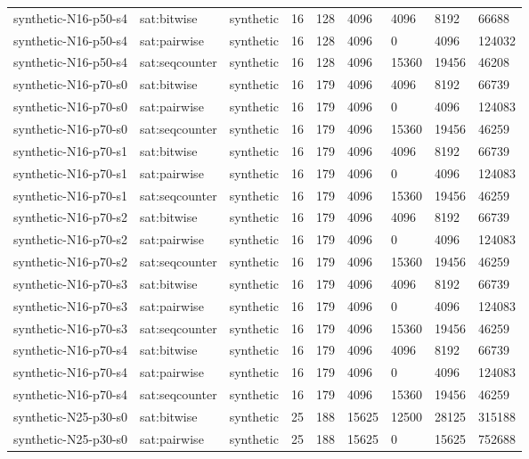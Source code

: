 \begin{tabular}{lllllllll}
synthetic-N16-p50-s4 & sat:bitwise & synthetic & 16 & 128 & 4096 & 4096 & 8192 & 66688 \\
synthetic-N16-p50-s4 & sat:pairwise & synthetic & 16 & 128 & 4096 & 0 & 4096 & 124032 \\
synthetic-N16-p50-s4 & sat:seqcounter & synthetic & 16 & 128 & 4096 & 15360 & 19456 & 46208 \\
synthetic-N16-p70-s0 & sat:bitwise & synthetic & 16 & 179 & 4096 & 4096 & 8192 & 66739 \\
synthetic-N16-p70-s0 & sat:pairwise & synthetic & 16 & 179 & 4096 & 0 & 4096 & 124083 \\
synthetic-N16-p70-s0 & sat:seqcounter & synthetic & 16 & 179 & 4096 & 15360 & 19456 & 46259 \\
synthetic-N16-p70-s1 & sat:bitwise & synthetic & 16 & 179 & 4096 & 4096 & 8192 & 66739 \\
synthetic-N16-p70-s1 & sat:pairwise & synthetic & 16 & 179 & 4096 & 0 & 4096 & 124083 \\
synthetic-N16-p70-s1 & sat:seqcounter & synthetic & 16 & 179 & 4096 & 15360 & 19456 & 46259 \\
synthetic-N16-p70-s2 & sat:bitwise & synthetic & 16 & 179 & 4096 & 4096 & 8192 & 66739 \\
synthetic-N16-p70-s2 & sat:pairwise & synthetic & 16 & 179 & 4096 & 0 & 4096 & 124083 \\
synthetic-N16-p70-s2 & sat:seqcounter & synthetic & 16 & 179 & 4096 & 15360 & 19456 & 46259 \\
synthetic-N16-p70-s3 & sat:bitwise & synthetic & 16 & 179 & 4096 & 4096 & 8192 & 66739 \\
synthetic-N16-p70-s3 & sat:pairwise & synthetic & 16 & 179 & 4096 & 0 & 4096 & 124083 \\
synthetic-N16-p70-s3 & sat:seqcounter & synthetic & 16 & 179 & 4096 & 15360 & 19456 & 46259 \\
synthetic-N16-p70-s4 & sat:bitwise & synthetic & 16 & 179 & 4096 & 4096 & 8192 & 66739 \\
synthetic-N16-p70-s4 & sat:pairwise & synthetic & 16 & 179 & 4096 & 0 & 4096 & 124083 \\
synthetic-N16-p70-s4 & sat:seqcounter & synthetic & 16 & 179 & 4096 & 15360 & 19456 & 46259 \\
synthetic-N25-p30-s0 & sat:bitwise & synthetic & 25 & 188 & 15625 & 12500 & 28125 & 315188 \\
synthetic-N25-p30-s0 & sat:pairwise & synthetic & 25 & 188 & 15625 & 0 & 15625 & 752688 \\

\end{tabular}
